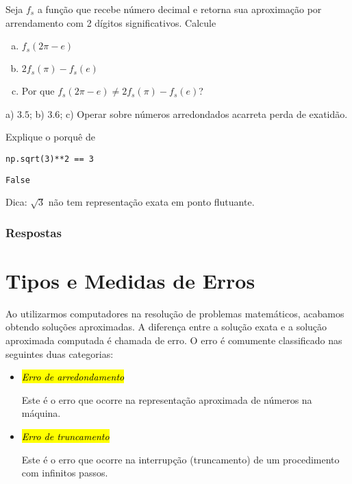\begin{exer}
  Seja $f_s$ a função que recebe número decimal e retorna sua aproximação por arrendamento com 2 dígitos significativos. Calcule
  \begin{enumerate}[a)]
  \item $f_s(2\pi - e)$
  \item $2f_s(\pi) - f_s(e)$
  \item Por que $f_s(2\pi - e) \neq  2f_s(\pi) - f_s(e)$?
  \end{enumerate}
\end{exer}
\begin{resp}
  a) $3.5$; b) $3.6$; c) Operar sobre números arredondados acarreta perda de exatidão.
\end{resp}


\begin{exer}
  Explique o porquê de

\begin{lstlisting}
np.sqrt(3)**2 == 3
\end{lstlisting}

\begin{verbatim}
False
\end{verbatim}

\end{exer}
\begin{resp}
  Dica: $\sqrt{3}$ não tem representação exata em ponto flutuante.
\end{resp}

\ifisbook
\subsubsection{Respostas}
\shipoutAnswer
\fi


\section{Tipos e Medidas de Erros}\label{cap_aritm_sec_erros}

Ao utilizarmos computadores na resolução de problemas matemáticos, acabamos obtendo soluções aproximadas. A diferença entre a solução exata e a solução aproximada computada é chamada de erro. O erro é comumente classificado nas seguintes duas categorias:
\begin{itemize}
\item \hl{\emph{Erro de arredondamento}}

  Este é o erro que ocorre na representação aproximada de números na máquina.
  
\item \hl{\emph{Erro de truncamento}}

  Este é o erro que ocorre na interrupção (truncamento) de um procedimento com infinitos passos.
\end{itemize}

